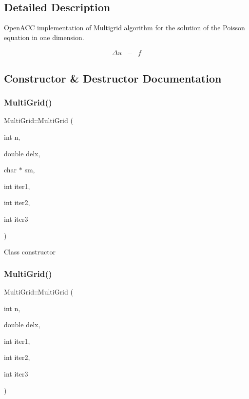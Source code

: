 \subsection{Detailed Description}
Open\+A\+CC implementation of Multigrid algorithm for the solution of the Poisson equation in one dimension. 

\begin{eqnarray*} \Delta u &=& f \end{eqnarray*} 

\subsection{Constructor \& Destructor Documentation}
\mbox{\label{classMultiGrid_ae0bd1f5ad888a0b0791674d3273343f6}} 
\subsubsection{\texorpdfstring{Multi\+Grid()}{MultiGrid()}\hspace{0.1cm}{\footnotesize\ttfamily [1/2]}}
{\footnotesize\ttfamily Multi\+Grid\+::\+Multi\+Grid (\begin{DoxyParamCaption}\item[{int}]{n,  }\item[{double}]{delx,  }\item[{char $\ast$}]{sm,  }\item[{int}]{iter1,  }\item[{int}]{iter2,  }\item[{int}]{iter3 }\end{DoxyParamCaption})}

Class constructor \mbox{\label{classMultiGrid_a5828418459e380cab698e100f046d69b}} 
\subsubsection{\texorpdfstring{Multi\+Grid()}{MultiGrid()}\hspace{0.1cm}{\footnotesize\ttfamily [2/2]}}
{\footnotesize\ttfamily Multi\+Grid\+::\+Multi\+Grid (\begin{DoxyParamCaption}\item[{int}]{n,  }\item[{double}]{delx,  }\item[{int}]{iter1,  }\item[{int}]{iter2,  }\item[{int}]{iter3 }\end{DoxyParamCaption})}


